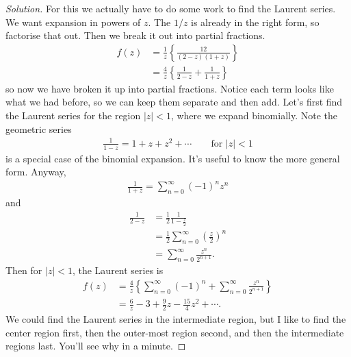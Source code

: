 \begin{proof}[Solution]
    For this we actually have to do some work to find the Laurent series.
    We want expansion in powers of $z$.
    The $1/z$ is already in the right form, so factorise that out.
    Then we break it out into partial fractions.
    \begin{align}
        f(z) &=
        \frac{1}{z}\left\{
            \frac{12}{(2 - z)(1 + z)}
        \right\}\\
        &= \frac{4}{z}\left\{
            \frac{1}{2 - z}
            + \frac{1}{1 + z}
        \right\}
    \end{align}
    so now we have broken it up into partial fractions.
    Notice each term looks like what we had before,
    so we can keep them separate and then add.
    Let's first find the Laurent series for the region $|z|<1$,
    where we expand binomially.
    Note the geometric series
    \begin{align}
        \frac{1}{1 - z} = 1 + z + z^2 + \cdots \qquad
        \text{for }|z| < 1
    \end{align}
    is a special case of the binomial expansion.
    It's useful to know the more general form.
    Anyway,
    \begin{align}
        \frac{1}{1 + z} =
        \sum_{n=0}^{\infty}(-1)^n z^n
    \end{align}
    and
    \begin{align}
        \frac{1}{2 - z} &=
        \frac{1}{2} \frac{1}{1 - \frac{z}{2}}\\
        &= \frac{1}{2}\sum_{n=0}^{\infty}\left( \frac{z}{2} \right)^n\\
        &= \sum_{n=0}^{\infty}\frac{z^n}{2^{n + 1}}.
    \end{align}
    Then for $|z|<1$, the Laurent series is
    \begin{align}
        f(z) &= \frac{4}{z}\left\{
            \sum_{n=0}^{\infty}(-1)^n
            + \sum_{n=0}^{\infty} \frac{z^n}{2^{n + 1}}
        \right\}\\
        &= \frac{6}{z} - 3 + \frac{9}{2}z - \frac{15}{4} z^2 + \cdots.
    \end{align}
    We could find the Laurent series in the intermediate region,
    but I like to find the center region first,
    then the outer-most region second,
    and then the intermediate regions last.
    You'll see why in a minute.


\end{proof}
